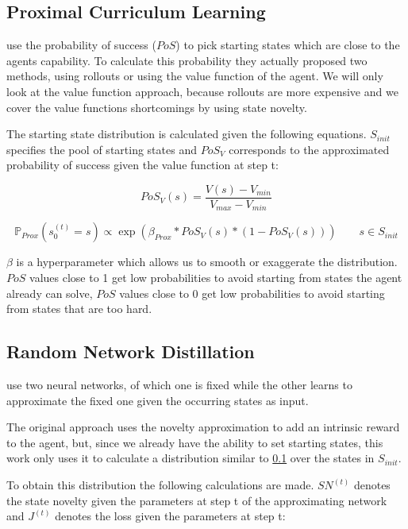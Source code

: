 \documentclass{article}
\begin{document}
\subsection{Proximal Curriculum Learning}
\label{sec:prox_detail}
\cite{prox_curr} use the probability of success ($PoS$) to pick starting states which are close to the agents capability.
To calculate this probability they actually proposed two methods, using rollouts or using the value function of the agent. We will only look at the value function approach, because rollouts are more expensive and we cover the value functions shortcomings by using state novelty.

The starting state distribution is calculated given the following equations. $S_{init}$ specifies the pool of starting states and $PoS_V$ corresponds to the approximated probability of success given the value function at step t:

\[  PoS_V(s) = \frac{V(s) - V_{min}}{V_{max} - V_{min}} \]

\begin{equation}\label{dist:prox_curr}
  \mathbb{P}_{Prox}(s_0^{(t)} = s) \propto \exp(\beta_{Prox} * PoS_V(s) * (1 - PoS_V(s))) \qquad s \in S_{init}
\end{equation}

$\beta$ is a hyperparameter which allows us to smooth or exaggerate the distribution. $PoS$ values close to 1 get low probabilities to avoid starting from states the agent already can solve, $PoS$ values close to 0 get low probabilities to avoid starting from states that are too hard.

\subsection{Random Network Distillation}
\label{sec:rnd}
\cite{rnd} use two neural networks, of which one is fixed while the other learns to approximate the fixed one given the occurring states as input.

The original approach uses the novelty approximation to add an intrinsic reward to the agent, but, since we already have the ability to set starting states, this work only uses it to calculate a distribution similar to \cref{sec:prox_detail} over the states in $S_{init}$.

To obtain this distribution the following calculations are made. $SN^{(t)}$ denotes the state novelty given the parameters at step t of the approximating network and $J^{(t)}$ denotes the loss given the parameters at step t:
\end{document}
